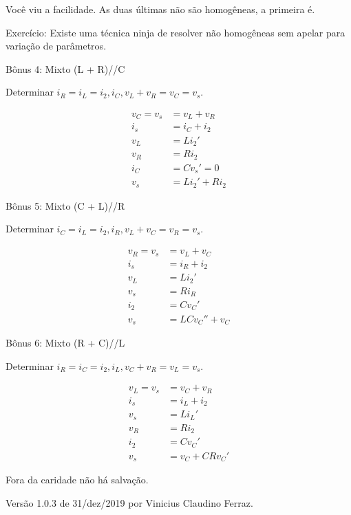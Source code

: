 \documentclass[12pt,a4paper]{article}
\begin{document}
Voc\^e viu a facilidade. As duas \'ultimas n\~ao s\~ao homog\^eneas, a primeira \'e.

Exerc\'icio: Existe uma t\'ecnica ninja de resolver n\~ao homog\^eneas sem apelar para varia\c{c}\~ao de par\^ametros.

\Large

B\^onus 4: Mixto (L + R)//C

\normalsize

Determinar $i_R = i_L = i_2, i_C, v_L + v_R = v_C = v_s$.

\begin{align}
v_C = v_s &= v_L + v_R \\
i_s &= i_C + i_2 \\
v_L &= L i_2' \\
v_R &= Ri_2 \\
i_C &= C v_s' = 0 \\
v_s &= L i_2' + R i_2
\end{align}

\vspace{100mm}

\Large

B\^onus 5: Mixto (C + L)//R

\normalsize

Determinar $i_C = i_L = i_2, i_R, v_L + v_C = v_R = v_s$.

\begin{align}
v_R = v_s &= v_L + v_C \\
i_s &= i_R + i_2 \\
v_L &= L i_2' \\
v_s &= Ri_R \\
i_2 &= C v_C' \\
v_s &= L C v_C'' + v_C
\end{align}

\Large

B\^onus 6: Mixto (R + C)//L

\normalsize

Determinar $i_R = i_C = i_2, i_L, v_C + v_R = v_L = v_s$.

\begin{align}
v_L = v_s &= v_C + v_R \\
i_s &= i_L + i_2 \\
v_s &= L i_L' \\
v_R &= Ri_2 \\
i_2 &= C v_C' \\
v_s &= v_C + CR v_C'
\end{align}

\vspace{6mm}

Fora da caridade n\~ao h\'a salva\c{c}\~ao.

\vspace{6mm}

Vers\~ao 1.0.3 de 31/dez/2019 por Vinicius Claudino Ferraz.
\end{document}
